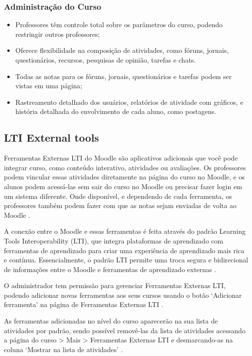 \subsubsection{Administração do Curso}

\begin{itemize}
    \item Professores têm controle total sobre os parâmetros do curso, podendo restringir outros professores;
    \item Oferece flexibilidade na composição de atividades, como fóruns, jornais, questionários, recursos, pesquisas de opinião, tarefas e chats. 
    \item Todas as notas para os fóruns, jornais, questionários e tarefas podem ser vistas em uma página;
    \item Rastreamento detalhado dos usuários, relatórios de atividade com gráficos, e história detalhada do envolvimento de cada aluno, como postagens.
\end{itemize}

\subsection{LTI External tools}

Ferramentas Externas LTI do Moodle são aplicativos adicionais que você pode integrar curso, como conteúdo interativo, atividades ou avaliações. Os professores podem vincular essas atividades diretamente na página do curso no Moodle, e os alunos podem acessá-las sem sair do curso no Moodle ou precisar fazer login em um sistema diferente. Onde disponível, e dependendo de cada ferramenta, os professores também podem fazer com que as notas sejam enviadas de volta ao Moodle \cite{moodle}.

A conexão entre o Moodle e essas ferramentas é feita através do padrão Learning Tools Interoperability (LTI), que integra plataformas de aprendizado com ferramentas de aprendizado para criar uma experiência de aprendizado mais rica e contínua. Essencialmente, o padrão LTI permite uma troca segura e bidirecional de informações entre o Moodle e ferramentas de aprendizado externas \cite{moodle}. 

O administrador tem permissão para gerenciar Ferramentas Externas LTI, podendo adicionar novas ferramentas aos seus cursos usando o botão ‘Adicionar ferramenta’ na página de Ferramentas Externas LTI \cite{moodle}.

As ferramentas adicionadas no nível do curso aparecerão na sua lista de atividades por padrão, sendo possível removê-las da lista de atividades acessando a página do curso > Mais > Ferramentas Externas LTI e desmarcando-as na coluna ‘Mostrar na lista de atividades’ \cite{moodle}.

